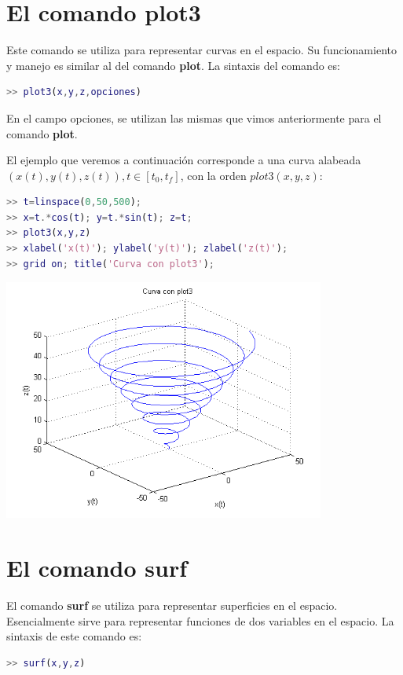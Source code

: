 \section{El comando plot3}

Este comando se utiliza para representar curvas en el espacio. Su funcionamiento y manejo es similar al del comando \textbf{plot}. La sintaxis del comando es:

\begin{lstlisting}[language=Matlab]
>> plot3(x,y,z,opciones)
\end{lstlisting}

En el campo opciones, se utilizan las mismas que vimos anteriormente para el comando \textbf{plot}.

El ejemplo que veremos a continuación corresponde a una curva alabeada $(x(t), y(t), z(t)), t \in [t_{0}, t_{f} ]$, con la orden $plot3(x,y,z)$:

\begin{lstlisting}[language=Matlab]
>> t=linspace(0,50,500);
>> x=t.*cos(t); y=t.*sin(t); z=t;
>> plot3(x,y,z)
>> xlabel('x(t)'); ylabel('y(t)'); zlabel('z(t)');
>> grid on; title('Curva con plot3');
\end{lstlisting}
\includegraphics[width=300pt]{./Imagenes/3d1.png}


\section{El comando surf}

El comando \textbf{surf} se utiliza para representar superficies en el espacio. Esencialmente sirve para representar funciones de dos variables en el espacio. La sintaxis de este comando es:

\begin{lstlisting}[language=Matlab]
>> surf(x,y,z)
\end{lstlisting}

